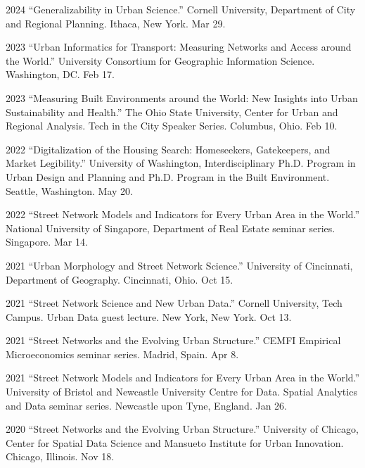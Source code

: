 \documentclass[11pt,letterpaper]{report} %
\begin{document}
\begin{tablist}
        \item[2024] \tab{}\enquote{Generalizability in Urban Science.} Cornell University, Department of City and Regional Planning. Ithaca, New York. Mar 29.

        \item[2023] \tab{}\enquote{Urban Informatics for Transport: Measuring Networks and Access around the World.} University Consortium for Geographic Information Science. Washington, DC\@. Feb 17.

        \item[2023] \tab{}\enquote{Measuring Built Environments around the World: New Insights into Urban Sustainability and Health.} The Ohio State University, Center for Urban and Regional Analysis. Tech in the City Speaker Series. Columbus, Ohio. Feb 10.

        \item[2022] \tab{}\enquote{Digitalization of the Housing Search: Homeseekers, Gatekeepers, and Market Legibility.} University of Washington, Interdisciplinary Ph.D. Program in Urban Design and Planning and Ph.D. Program in the Built Environment. Seattle, Washington. May 20.

        \item[2022] \tab{}\enquote{Street Network Models and Indicators for Every Urban Area in the World.} National University of Singapore, Department of Real Estate seminar series. Singapore. Mar 14.

        \item[2021] \tab{}\enquote{Urban Morphology and Street Network Science.} University of Cincinnati, Department of Geography. Cincinnati, Ohio. Oct 15.

        \item[2021] \tab{}\enquote{Street Network Science and New Urban Data.} Cornell University, Tech Campus. Urban Data guest lecture. New York, New York. Oct 13.

        \item[2021] \tab{}\enquote{Street Networks and the Evolving Urban Structure.} CEMFI Empirical Microeconomics seminar series. Madrid, Spain. Apr 8.

        \item[2021] \tab{}\enquote{Street Network Models and Indicators for Every Urban Area in the World.} University of Bristol and Newcastle University Centre for Data. Spatial Analytics and Data seminar series. Newcastle upon Tyne, England. Jan 26.

        \item[2020] \tab{}\enquote{Street Networks and the Evolving Urban Structure.} University of Chicago, Center for Spatial Data Science and Mansueto Institute for Urban Innovation. Chicago, Illinois. Nov 18.


\end{tablist}
\end{document}
